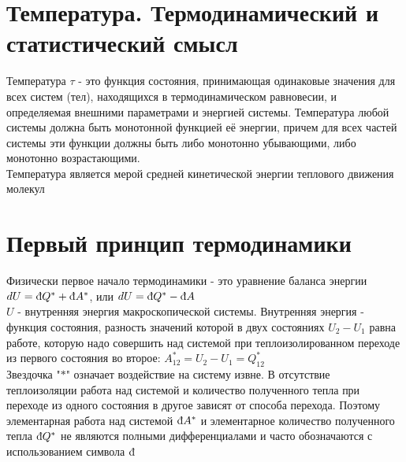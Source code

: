 \begin{multicols*}{2}
		\section{Температура. Термодинамический и статистический смысл}
		Температура $\tau$ - это функция состояния, принимающая одинаковые значения для всех систем (тел), находящихся в термодинамическом равновесии, и определяемая внешними параметрами и энергией системы. Температура любой системы должна быть монотонной функцией её энергии, причем для всех частей системы эти функции должны быть либо монотонно убывающими, либо монотонно возрастающими.\\
		Температура является мерой средней кинетической энергии теплового движения молекул\\

		\section{Первый принцип термодинамики}
		Физически первое начало термодинамики - это уравнение баланса энергии\\
		$dU = \mbox{\dj}Q^* + \mbox{\dj}A^*$, или $dU = \mbox{\dj}Q^* - \mbox{\dj}A$\\
		$U$ - внутренняя энергия макроскопической системы. Внутренняя энергия - функция состояния, разность значений которой в двух состояниях $U_2 - U_1$ равна работе, которую надо совершить над системой при теплоизолированном переходе из первого состояния во второе: $A^*_{12} = U_2 - U_1 = Q^*_{12}$\\
		Звездочка "$*$" означает воздействие на систему извне. В отсутствие теплоизоляции работа над системой и количество полученного тепла при переходе из одного состояния в другое зависят от способа перехода. Поэтому элементарная работа над системой $\mbox{\dj}A^*$ и элементарное количество полученного тепла $\mbox{\dj}Q^*$ не являются полными дифференциалами и часто обозначаются с использованием символа $\mbox{\dj}$\\


\end{multicols*}
